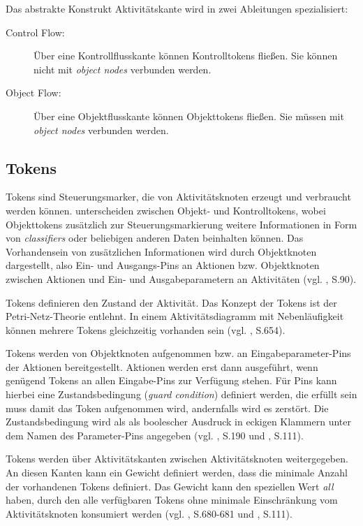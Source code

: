 Das abstrakte Konstrukt Aktivitätskante wird in zwei Ableitungen spezialisiert:
\begin{description}
\item[Control Flow:] Über eine Kontrollflusskante können Kontrolltokens fließen. Sie können nicht mit \emph{object nodes} verbunden werden.
\item[Object Flow:] Über eine Objektflusskante können Objekttokens fließen. Sie müssen mit \emph{object nodes} verbunden werden.
\end{description}




\subsection{Tokens}
Tokens sind Steuerungsmarker, die von Aktivitätsknoten erzeugt und verbraucht werden können. \citep{WeilkiensOestereich2004} unterscheiden zwischen Objekt- und Kontrolltokens, wobei Objekttokens zusätzlich zur Steuerungsmarkierung weitere Informationen in Form von \emph{classifiers} oder beliebigen anderen Daten beinhalten können. Das Vorhandensein von zusätzlichen Informationen wird durch Objektknoten dargestellt, also Ein- und Ausgangs-Pins an Aktionen bzw. Objektknoten zwischen Aktionen und Ein- und Ausgabeparametern an Aktivitäten (vgl. \citep{WeilkiensOestereich2004}, S.90).

Tokens definieren den Zustand der Aktivität. Das Konzept der Tokens ist der Petri-Netz-Theorie entlehnt. In einem Aktivitätsdiagramm mit Nebenläufigkeit können mehrere Tokens gleichzeitig vorhanden sein (vgl. \citep{RumbaughJacobsonBooch2005}, S.654).

Tokens werden von Objektknoten aufgenommen bzw. an Eingabeparameter-Pins der Aktionen bereitgestellt. Aktionen werden erst dann ausgeführt, wenn genügend Tokens an allen Eingabe-Pins zur Verfügung stehen. Für Pins kann hierbei eine Zustandsbedingung (\emph{guard condition}) definiert werden, die erfüllt sein muss damit das Token aufgenommen wird, andernfalls wird es zerstört. Die Zustandsbedingung wird als als boolescher Ausdruck in eckigen Klammern unter dem Namen des Parameter-Pins angegeben (vgl. \citep{HitzEtAl2005}, S.190 und \citep{PilonePitman2005}, S.111).


Tokens werden über Aktivitätskanten zwischen Aktivitätsknoten weitergegeben. An diesen Kanten kann ein Gewicht definiert werden, dass die minimale Anzahl der vorhandenen Tokens definiert. Das Gewicht kann den speziellen Wert \emph{all} haben, durch den alle verfügbaren Tokens ohne minimale Einschränkung vom Aktivitätsknoten konsumiert werden (vgl. \citep{RumbaughJacobsonBooch2005}, S.680-681 und \citep{PilonePitman2005}, S.111).

